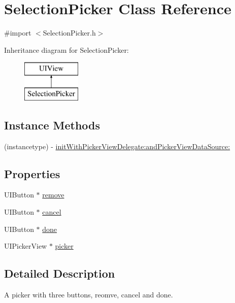 \hypertarget{interface_selection_picker}{\section{Selection\+Picker Class Reference}
\label{interface_selection_picker}
}


{\ttfamily \#import $<$Selection\+Picker.\+h$>$}

Inheritance diagram for Selection\+Picker\+:\begin{figure}[H]
\begin{center}
\leavevmode
\includegraphics[height=2.000000cm]{interface_selection_picker}
\end{center}
\end{figure}
\subsection*{Instance Methods}
\begin{DoxyCompactItemize}
\item 
(instancetype) -\/ \hyperlink{interface_selection_picker_ad5fcb03fe065cf8fcaf765825562cfc1}{init\+With\+Picker\+View\+Delegate\+:and\+Picker\+View\+Data\+Source\+:}
\end{DoxyCompactItemize}
\subsection*{Properties}
\begin{DoxyCompactItemize}
\item 
U\+I\+Button $\ast$ \hyperlink{interface_selection_picker_a060c08f65fc47029ed1902e796a03925}{remove}
\item 
U\+I\+Button $\ast$ \hyperlink{interface_selection_picker_ad419e9278ed75268dda0e48c5ce43822}{cancel}
\item 
U\+I\+Button $\ast$ \hyperlink{interface_selection_picker_aa43b12e68fd0c7c20745380fc60b6b88}{done}
\item 
U\+I\+Picker\+View $\ast$ \hyperlink{interface_selection_picker_aa2a3f2d050d8e454ee7158ab17735c5f}{picker}
\end{DoxyCompactItemize}


\subsection{Detailed Description}
A picker with three buttons, reomve, cancel and done. 

